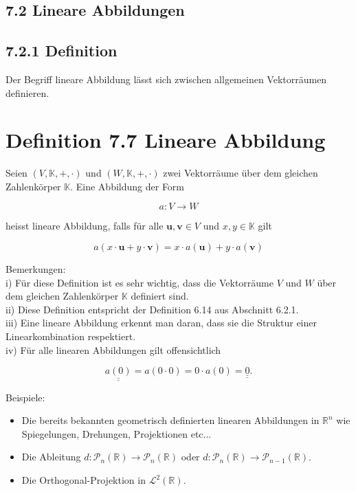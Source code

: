 \documentclass[10pt]{article}
\begin{document}
\subsection*{7.2 Lineare Abbildungen}
\subsection*{7.2.1 Definition}
Der Begriff lineare Abbildung lässt sich zwischen allgemeinen Vektorräumen definieren.

\section*{Definition 7.7 Lineare Abbildung}
Seien $(V, \mathbb{K},+, \cdot)$ und $(W, \mathbb{K},+, \cdot)$ zwei Vektorräume über dem gleichen Zahlenkörper $\mathbb{K}$. Eine Abbildung der Form


\begin{equation*}
a: V \rightarrow W \tag{7.34}
\end{equation*}


heisst lineare Abbildung, falls für alle $\mathbf{u}, \mathbf{v} \in V$ und $x, y \in \mathbb{K}$ gilt


\begin{equation*}
a(x \cdot \mathbf{u}+y \cdot \mathbf{v})=x \cdot a(\mathbf{u})+y \cdot a(\mathbf{v}) \tag{7.35}
\end{equation*}


Bemerkungen:\\
i) Für diese Definition ist es sehr wichtig, dass die Vektorräume $V$ und $W$ über dem gleichen Zahlenkörper $\mathbb{K}$ definiert sind.\\
ii) Diese Definition entspricht der Definition 6.14 aus Abschnitt 6.2.1.\\
iii) Eine lineare Abbildung erkennt man daran, dass sie die Struktur einer Linearkombination respektiert.\\
iv) Für alle linearen Abbildungen gilt offensichtlich


\begin{equation*}
\underline{\underline{a(0)}}=a(0 \cdot 0)=0 \cdot a(0)=\underline{\underline{0}} . \tag{7.36}
\end{equation*}


Beispiele:

\begin{itemize}
  \item Die bereits bekannten geometrisch definierten linearen Abbildungen in $\mathbb{R}^{n}$ wie Spiegelungen, Drehungen, Projektionen etc...
  \item Die Ableitung $d: \mathcal{P}_{n}(\mathbb{R}) \rightarrow \mathcal{P}_{n}(\mathbb{R})$ oder $d: \mathcal{P}_{n}(\mathbb{R}) \rightarrow \mathcal{P}_{n-1}(\mathbb{R})$.
  \item Die Orthogonal-Projektion in $\mathcal{L}^{2}(\mathbb{R})$.
\end{itemize}
\end{document}
